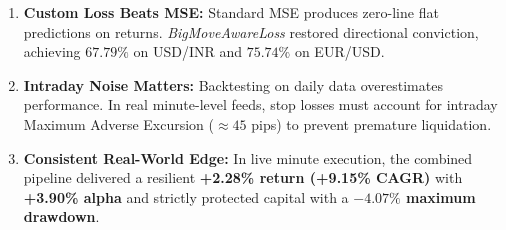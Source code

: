\documentclass[11pt,oneside,letterpaper,english]{article}
\begin{document}
\begin{enumerate}[leftmargin=1.2cm, itemsep=2pt]
	\item \textbf{Custom Loss Beats MSE:} Standard MSE produces zero-line flat predictions on returns. \textit{BigMoveAwareLoss} restored directional conviction, achieving $67.79\%$ on USD/INR and $75.74\%$ on EUR/USD.
	\item \textbf{Intraday Noise Matters:} Backtesting on daily data overestimates performance. In real minute-level feeds, stop losses must account for intraday Maximum Adverse Excursion ($\approx 45$ pips) to prevent premature liquidation.
	\item \textbf{Consistent Real-World Edge:} In live minute execution, the combined pipeline delivered a resilient \textbf{+2.28\% return (+9.15\% CAGR)} with \textbf{+3.90\% alpha} and strictly protected capital with a \textbf{$-4.07\%$ maximum drawdown}.
\end{enumerate}
\end{document}
